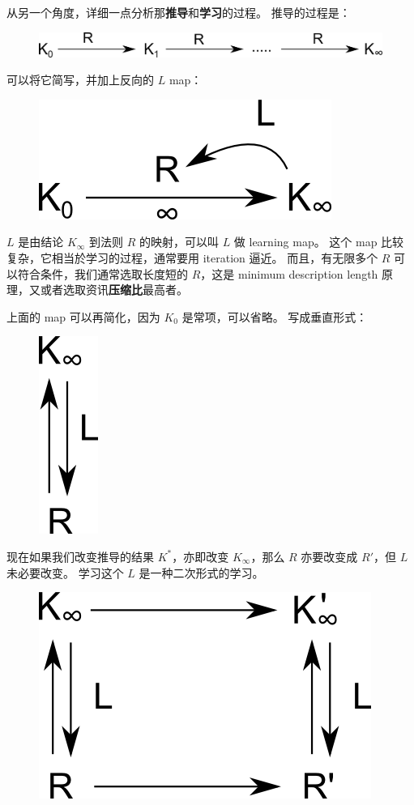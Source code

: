 \documentclass[12pt]{article}
\begin{document}
从另一个角度，详细一点分析那\textbf{推导}和\textbf{学习}的过程。  推导的过程是：
\begin{figure}[H]
\centering
\includegraphics[scale=0.6]{2nd-order-maps-0.png}
\end{figure}
可以将它简写，并加上反向的 $L$ map：
\begin{figure}[H]
\centering
\includegraphics[scale=0.6]{2nd-order-maps-1.png}
\end{figure}
$L$ 是由结论 $K_\infty$ 到法则 $R$ 的映射，可以叫 $L$ 做 learning map。  这个 map 比较复杂，它相当於学习的过程，通常要用 iteration 逼近。  而且，有无限多个 $R$ 可以符合条件，我们通常选取长度短的 $R$，这是 minimum description length 原理，又或者选取资讯\textbf{压缩比}最高者。

上面的 map 可以再简化，因为 $K_0$ 是常项，可以省略。  写成垂直形式：
\begin{figure}[H]
\centering
\includegraphics[scale=0.6]{2nd-order-maps-2.png}
\end{figure}

现在如果我们改变推导的结果 $K^*$，亦即改变 $K_\infty$，那么 $R$ 亦要改变成 $R'$，但 $L$ 未必要改变。  学习这个 $L$ 是一种二次形式的学习。
\begin{figure}[H]
\centering
\includegraphics[scale=0.6]{2nd-order-maps-3.png}
\end{figure}
\end{document}
